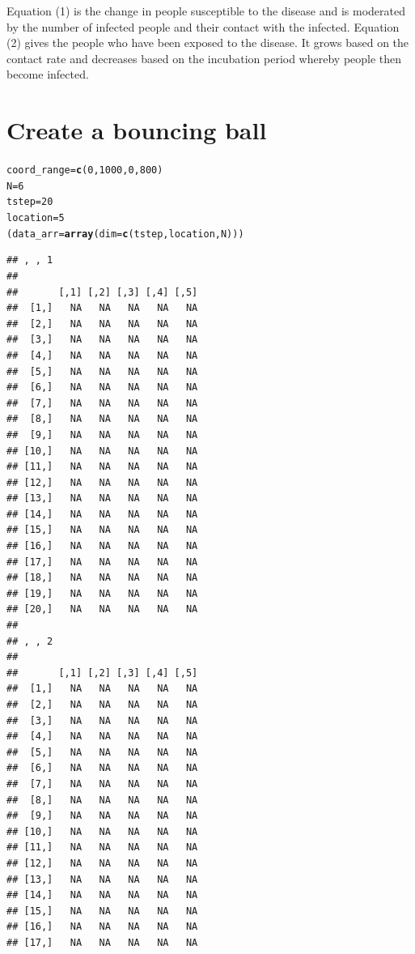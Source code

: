 \documentclass{article}\usepackage[]{graphicx}\usepackage[]{color}
\makeatletter
\newcommand{\hlnum}[1]{\textcolor[rgb]{0.686,0.059,0.569}{#1}}%
\newcommand{\hlstd}[1]{\textcolor[rgb]{0.345,0.345,0.345}{#1}}%
\newcommand{\hlkwb}[1]{\textcolor[rgb]{0.69,0.353,0.396}{#1}}%
\newcommand{\hlkwc}[1]{\textcolor[rgb]{0.333,0.667,0.333}{#1}}%
\newcommand{\hlkwd}[1]{\textcolor[rgb]{0.737,0.353,0.396}{\textbf{#1}}}%
\newenvironment{kframe}{%
 \def\at@end@of@kframe{}%
 \ifinner\ifhmode%
  \def\at@end@of@kframe{\end{minipage}}%
  \begin{minipage}{\columnwidth}%
 \fi\fi%
 \def\FrameCommand##1{\hskip\@totalleftmargin \hskip-\fboxsep
 \colorbox{shadecolor}{##1}\hskip-\fboxsep
     \hskip-\linewidth \hskip-\@totalleftmargin \hskip\columnwidth}%
 \MakeFramed {\advance\hsize-\width
   \@totalleftmargin\z@ \linewidth\hsize
   \@setminipage}}%
 {\par\unskip\endMakeFramed%
 \at@end@of@kframe}
\newenvironment{knitrout}{}{} %
\makeatother
\begin{document}
Equation (1) is the change in people susceptible to the disease and is moderated by the number of infected people and their contact with the infected. Equation (2) gives the people who have been exposed to the disease. It grows based on the contact rate and decreases based on the incubation period whereby people then become infected.


\section{Create a bouncing ball}
\begin{knitrout}
\color{fgcolor}\begin{kframe}
\begin{alltt}
\hlstd{coord_range} \hlkwb{=} \hlkwd{c}\hlstd{(}\hlnum{0}\hlstd{,} \hlnum{1000}\hlstd{,} \hlnum{0}\hlstd{,} \hlnum{800}\hlstd{)}
\hlstd{N} \hlkwb{=} \hlnum{6}
\hlstd{tstep} \hlkwb{=} \hlnum{20}
\hlstd{location} \hlkwb{=} \hlnum{5}
\hlstd{(data_arr} \hlkwb{=} \hlkwd{array}\hlstd{(}\hlkwc{dim}\hlstd{=}\hlkwd{c}\hlstd{(tstep,location, N)))}
\end{alltt}
\begin{verbatim}
## , , 1
## 
##       [,1] [,2] [,3] [,4] [,5]
##  [1,]   NA   NA   NA   NA   NA
##  [2,]   NA   NA   NA   NA   NA
##  [3,]   NA   NA   NA   NA   NA
##  [4,]   NA   NA   NA   NA   NA
##  [5,]   NA   NA   NA   NA   NA
##  [6,]   NA   NA   NA   NA   NA
##  [7,]   NA   NA   NA   NA   NA
##  [8,]   NA   NA   NA   NA   NA
##  [9,]   NA   NA   NA   NA   NA
## [10,]   NA   NA   NA   NA   NA
## [11,]   NA   NA   NA   NA   NA
## [12,]   NA   NA   NA   NA   NA
## [13,]   NA   NA   NA   NA   NA
## [14,]   NA   NA   NA   NA   NA
## [15,]   NA   NA   NA   NA   NA
## [16,]   NA   NA   NA   NA   NA
## [17,]   NA   NA   NA   NA   NA
## [18,]   NA   NA   NA   NA   NA
## [19,]   NA   NA   NA   NA   NA
## [20,]   NA   NA   NA   NA   NA
## 
## , , 2
## 
##       [,1] [,2] [,3] [,4] [,5]
##  [1,]   NA   NA   NA   NA   NA
##  [2,]   NA   NA   NA   NA   NA
##  [3,]   NA   NA   NA   NA   NA
##  [4,]   NA   NA   NA   NA   NA
##  [5,]   NA   NA   NA   NA   NA
##  [6,]   NA   NA   NA   NA   NA
##  [7,]   NA   NA   NA   NA   NA
##  [8,]   NA   NA   NA   NA   NA
##  [9,]   NA   NA   NA   NA   NA
## [10,]   NA   NA   NA   NA   NA
## [11,]   NA   NA   NA   NA   NA
## [12,]   NA   NA   NA   NA   NA
## [13,]   NA   NA   NA   NA   NA
## [14,]   NA   NA   NA   NA   NA
## [15,]   NA   NA   NA   NA   NA
## [16,]   NA   NA   NA   NA   NA
## [17,]   NA   NA   NA   NA   NA

\end{verbatim}
\end{kframe}
\end{knitrout}
\end{document}
